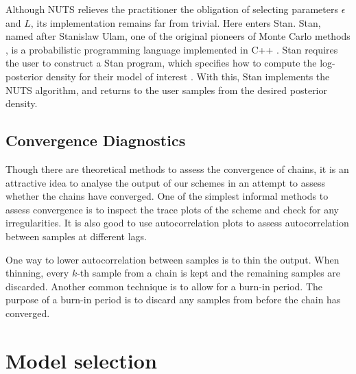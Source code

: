 Although NUTS relieves the practitioner the obligation of selecting parameters $\epsilon$
and $L$, its implementation remains far from trivial. Here enters Stan. Stan, named after
Stanislaw Ulam, one of the original pioneers of Monte Carlo methods
\parencite{metropolis49}, is a probabilistic programming language implemented in C++
\parencite{gelman15}. Stan requires the user to construct a Stan program, which specifies
how to compute the log-posterior density for their model of interest
\parencite{stanteam15}. With this, Stan implements the NUTS algorithm, and returns to the
user samples from the desired posterior density.

\subsection{Convergence Diagnostics}
\label{ssec:convergence_diagnostics}

Though there are theoretical methods to assess the convergence of chains, it is an attractive idea to
analyse the output of our schemes in an attempt to assess whether the chains have converged. One of
the simplest informal methods to assess convergence is to inspect the trace plots of the scheme and
check for any irregularities. It is also good to use autocorrelation plots to assess autocorrelation
between samples at different lags.

One way to lower autocorrelation between samples is to thin the output. When thinning, every $k$-th
sample from a chain is kept and the remaining samples are discarded. Another common technique is to
allow for a burn-in period. The purpose of a burn-in period is to discard any samples from before the
chain has converged.

\section{Model selection}
\label{sec:model_comparison}
